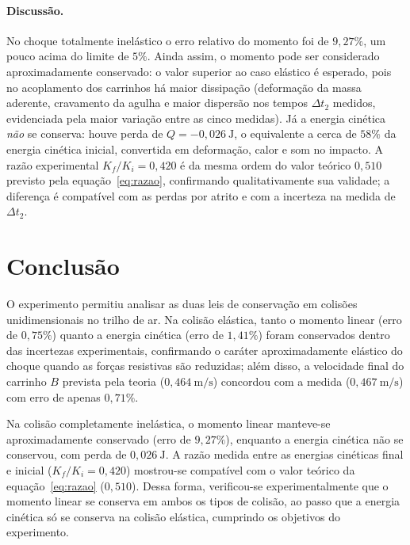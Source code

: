 \documentclass[12pt,a4paper]{article}
\begin{document}
\paragraph{Discussão.} No choque totalmente inelástico o erro relativo do momento foi de
$9{,}27\%$, um pouco acima do limite de $5\%$. Ainda assim, o momento pode ser considerado
aproximadamente conservado: o valor superior ao caso elástico é esperado, pois no acoplamento dos
carrinhos há maior dissipação (deformação da massa aderente, cravamento da agulha e maior
dispersão nos tempos $\Delta t_2$ medidos, evidenciada pela maior variação entre as cinco
medidas). Já a energia cinética \emph{não} se conserva: houve perda de $Q = -0{,}026~\mathrm{J}$,
o equivalente a cerca de $58\%$ da energia cinética inicial, convertida em deformação, calor e som
no impacto. A razão experimental $K_f/K_i = 0{,}420$ é da mesma ordem do valor teórico
$0{,}510$ previsto pela equação~\eqref{eq:razao}, confirmando qualitativamente sua validade; a
diferença é compatível com as perdas por atrito e com a incerteza na medida de $\Delta t_2$.


\section{Conclusão}
O experimento permitiu analisar as duas leis de conservação em colisões unidimensionais no trilho
de ar. Na colisão elástica, tanto o momento linear (erro de $0{,}75\%$) quanto a energia cinética
(erro de $1{,}41\%$) foram conservados dentro das incertezas experimentais, confirmando o
caráter aproximadamente elástico do choque quando as forças resistivas são reduzidas; além disso,
a velocidade final do carrinho $B$ prevista pela teoria ($0{,}464~\mathrm{m/s}$) concordou com a
medida ($0{,}467~\mathrm{m/s}$) com erro de apenas $0{,}71\%$.

Na colisão completamente inelástica, o momento linear manteve-se aproximadamente conservado
(erro de $9{,}27\%$), enquanto a energia cinética não se conservou, com perda de
$0{,}026~\mathrm{J}$. A razão medida entre as energias cinéticas final e inicial
($K_f/K_i = 0{,}420$) mostrou-se compatível com o valor teórico da equação~\eqref{eq:razao}
($0{,}510$). Dessa forma, verificou-se experimentalmente que o momento linear se conserva em
ambos os tipos de colisão, ao passo que a energia cinética só se conserva na colisão elástica,
cumprindo os objetivos do experimento.
\end{document}

